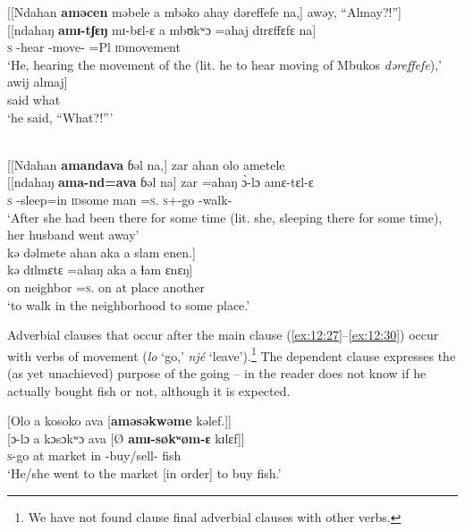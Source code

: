 \ea \label{ex:12:25}
{}[[Ndahan  \textbf{aməcen} məbele  a  mbəko  ahay  dəreffefe  na,]  awəy, “Almay?!”]\\
\gll  {}[[ndahaŋ  \textbf{amɪ-tʃɛŋ} mɪ-bɛl-ɛ    a  mbʊkʷɔ  =ahaj  dɪrɛffɛfɛ    na]\\  
 \hspaceThis{[[}\textsc{s} {\DEP}-hear  {\NOM}{}-move-{\CL}  {\GEN}    =Pl  \textsc{id}movement  {\PSP}\\  
 \glt ‘He, hearing the movement of the  (lit. he to hear moving of Mbukos \textit{dəreffefe}),’\\
 
 \medskip
 \gll awij  almaj]\\
      {said}  what\\
\glt  ‘he said, “What?!”’ 
\z 

\ea \label{ex:12:26}
\\
{}[[Ndahan  \textbf{amandava}  ɓəl  na,]  zar  ahan  olo  ametele\\  
\gll  {}[[ndahaŋ  \textbf{ama-nd=ava}  ɓəl  na]  zar   =ahaŋ  \`{ɔ}-lɔ amɛ-tɛl-ɛ\\ 
    \hspaceThis{[[}\textsc{s}         {\DEP}-sleep=in    \textsc{id}some  {\PSP}  man  =\textsc{s}.{\POSS}  \textsc{s}+{\PFV}-go   {\DEP}-walk-{\CL}\\      
\glt ‘After she had been there for some time (lit. she, sleeping there for some time), her husband went away’\\

\medskip
kə  dəlmete  ahan  aka  a  slam  enen.]\\
\gll kə dɪlmɛtɛ  =ahaŋ  aka a ɬam ɛnɛŋ]\\
     on   neighbor    =\textsc{s}.{\POSS}  on   at   place   another\\
\glt  ‘to walk in the neighborhood to some place.’
\z 

Adverbial clauses that occur after the main clause (\ref{ex:12:27}--\ref{ex:12:30}) occur with verbs of movement (\textit{lo} ‘go,’ \textit{njé} ‘leave’).\footnote{We have not found clause final adverbial clauses with other verbs.} The dependent clause expresses the (as yet unachieved) purpose of the going -- in  the reader does not know if he actually bought fish or not, although it is expected. 

\ea \label{ex:12:27}
{}[Olo  a  kosoko  ava  [\textbf{aməsəkwəme} kəlef.]]\\
\gll  {}[ɔ-lɔ a   kɔsɔkʷɔ   ava   [Ø  \textbf{amɪ-søkʷøm-ɛ}   kɪlɛf]]\\
      \textsc{s}-go  at  market  in  {}  {\DEP}-buy/sell-{\CL}  fish\\
\glt  ‘He/she went to the market [in order] to buy fish.’
\z 


